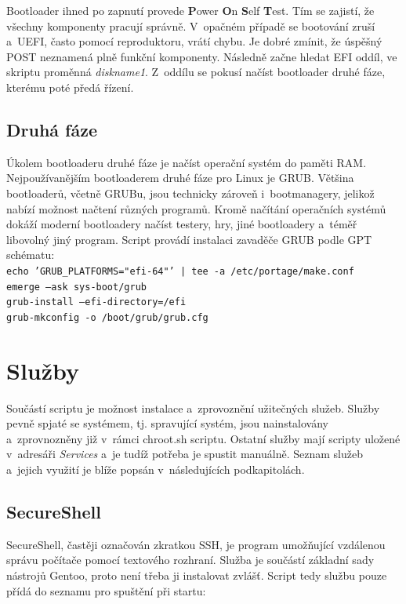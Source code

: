 \documentclass[12pt,a4paper,twoside,]{article}
\begin{document}
{{{{{{\hspace{-1.5em}Bootloader ihned po zapnutí provede {\bf P}ower {\bf O}n {\bf S}elf {\bf T}est. Tím se zajistí, že všechny komponenty pracují správně. V~opačném případě se bootování zruší a~UEFI, často pomocí reproduktoru, vrátí chybu. Je dobré zmínit, že úspěšný POST neznamená plně funkční komponenty. Následně začne hledat EFI oddíl, ve skriptu proměnná \textit{diskname1}. Z~oddílu se pokusí načíst bootloader druhé fáze, kterému poté předá řízení.

\subsection{\textsf{Druhá fáze}}
Úkolem bootloaderu druhé fáze je načíst operační systém do paměti RAM. Nejpoužívanějším bootloaderem druhé fáze pro Linux je GRUB. Většina bootloaderů, včetně GRUBu, jsou technicky zároveň i~bootmanagery, jelikož nabízí možnost načtení různých programů. Kromě načítání operačních systémů dokáží moderní bootloadery načíst testery, hry, jiné bootloadery a~téměř libovolný jiný program. Script provádí instalaci zavaděče GRUB podle GPT schématu:\\

\texttt{echo 'GRUB\_PLATFORMS="efi-64"' | tee -a /etc/portage/make.conf}\\
\hspace*{1.5em}\texttt{emerge --ask sys-boot/grub}\\
\hspace*{1.5em}\texttt{grub-install --efi-directory=/efi}\\
\hspace*{1.5em}\texttt{grub-mkconfig -o /boot/grub/grub.cfg}\\

\newpage
\section{\textsf{Služby}}
Součástí scriptu je možnost instalace a~zprovoznění užitečných služeb. Služby pevně spjaté se systémem, tj. spravující systém, jsou nainstalovány a~zprovnozněny již v~rámci chroot.sh scriptu. Ostatní služby mají scripty uložené v~adresáři \textit{Services} a~je tudíž potřeba je spustit manuálně. Seznam služeb a~jejich využití je blíže popsán v~následujících podkapitolách. 

\subsection{\textsf{SecureShell}}
SecureShell, častěji označován zkratkou SSH, je program umožňující vzdálenou správu počítače pomocí textového rozhraní. Služba je součástí základní sady nástrojů Gentoo, proto není třeba ji instalovat zvlášť. Script tedy službu pouze přídá do seznamu pro spuštění při startu: 

}}}}}}
\end{document}
